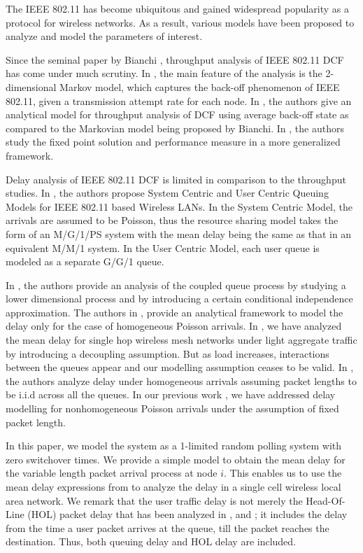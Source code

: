 \documentclass[10pt, conference, compsocconf]{IEEEtran}
\begin{document}
The IEEE 802.11 has become ubiquitous and gained widespread popularity as a protocol for wireless networks. As a result, various models have been proposed to analyze and model the parameters of interest.

Since the seminal paper by Bianchi \cite{bianchi}, throughput analysis of IEEE 802.11 DCF has come under much scrutiny. In \cite{bianchi}, the main feature of the analysis is the 2-dimensional Markov model, which captures the back-off phenomenon of IEEE 802.11, given a transmission attempt rate for each node. In \cite{tay}, the authors give an analytical model for throughput analysis of DCF using average back-off state as compared to the Markovian model being proposed by Bianchi. In \cite{akumar}, the authors study the fixed point solution and performance measure in a more generalized framework.

Delay analysis of IEEE 802.11 DCF is limited in comparison to the throughput studies. In \cite{tobagi}, the authors propose System Centric and User Centric Queuing Models for IEEE 802.11 based Wireless LANs. In the System Centric Model, the arrivals are assumed to be Poisson, thus the resource sharing model takes the form of an M/G/1/PS system with the mean delay being the same as that in an equivalent M/M/1 system. In the User Centric  Model, each user queue is modeled as a separate G/G/1 queue. 

In \cite{panda}, the authors provide an analysis of the coupled queue process by studying a lower dimensional process and by introducing a certain conditional independence approximation. The authors in \cite{panda}, provide an analytical framework to model the delay only for the case of homogeneous Poisson arrivals. In \cite{joy}, we have analyzed the mean delay for single hop wireless mesh networks under light aggregate traffic by introducing a decoupling assumption. But as load increases, interactions between the queues appear and our modelling assumption ceases to be valid. In \cite{tickoo}, the authors analyze delay under homogeneous arrivals assuming packet lengths to be i.i.d across all the queues. In our previous work \cite{saurabh}, we have addressed delay modelling for nonhomogeneous Poisson arrivals under the assumption of fixed packet length.

In this paper, we model the system as a 1-limited random polling system with zero switchover times. We provide a simple model to obtain the mean delay for the variable length packet arrival process at node $i$. This enables us to use the mean delay expressions from \cite{lee} to analyze the delay in a single cell wireless local area network. We remark that the user traffic delay is not merely the Head-Of-Line (HOL) packet delay that has been analyzed in \cite{bianchi}, \cite{tay} and \cite{akumar}; it includes the delay from the time a user packet arrives at the queue, till the packet reaches the destination. Thus, both queuing delay and HOL delay are included. 
\end{document}
